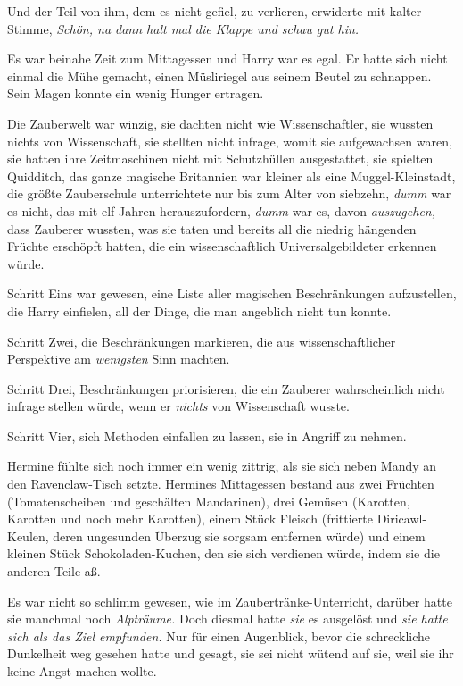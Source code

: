 {Und der Teil von ihm, dem es nicht gefiel, zu verlieren, erwiderte mit kalter Stimme, \emph{Schön, na dann halt mal die Klappe und schau gut hin.}

\later

Es war beinahe Zeit zum Mittagessen und Harry war es egal. Er hatte sich nicht einmal die Mühe gemacht, einen Müsliriegel aus seinem Beutel zu schnappen. Sein Magen konnte ein wenig Hunger ertragen.

Die Zauberwelt war winzig, sie dachten nicht wie Wissenschaftler, sie wussten nichts von Wissenschaft, sie stellten nicht infrage, womit sie aufgewachsen waren, sie hatten ihre Zeitmaschinen nicht mit Schutzhüllen ausgestattet, sie spielten Quidditch, das ganze magische Britannien war kleiner als eine Muggel-Kleinstadt, die größte Zauberschule unterrichtete nur bis zum Alter von siebzehn, \emph{dumm} war es nicht, das mit elf Jahren herauszufordern, \emph{dumm} war es, davon \emph{auszugehen,} dass Zauberer wussten, was sie taten und bereits all die niedrig hängenden Früchte erschöpft hatten, die ein wissenschaftlich Universalgebildeter erkennen würde.

Schritt Eins war gewesen, eine Liste aller magischen Beschränkungen aufzustellen, die Harry einfielen, all der Dinge, die man angeblich nicht tun konnte.

Schritt Zwei, die Beschränkungen markieren, die aus wissenschaftlicher Perspektive am \emph{wenigsten} Sinn machten.

Schritt Drei, Beschränkungen priorisieren, die ein Zauberer wahrscheinlich nicht infrage stellen würde, wenn er \emph{nichts} von Wissenschaft wusste.

Schritt Vier, sich Methoden einfallen zu lassen, sie in Angriff zu nehmen.

\later

Hermine fühlte sich noch immer ein wenig zittrig, als sie sich neben Mandy an den Ravenclaw-Tisch setzte. Hermines Mittagessen bestand aus zwei Früchten (Tomatenscheiben und geschälten Mandarinen), drei Gemüsen (Karotten, Karotten und noch mehr Karotten), einem Stück Fleisch (frittierte Diricawl-Keulen, deren ungesunden Überzug sie sorgsam entfernen würde) und einem kleinen Stück Schokoladen-Kuchen, den sie sich verdienen würde, indem sie die anderen Teile aß.

Es war nicht so schlimm gewesen, wie im Zaubertränke-Unterricht, darüber hatte sie manchmal noch \emph{Alpträume.} Doch diesmal hatte \emph{sie} es ausgelöst und \emph{sie hatte sich als das Ziel empfunden.} Nur für einen Augenblick, bevor die schreckliche Dunkelheit weg gesehen hatte und gesagt, sie sei nicht wütend auf sie, weil sie ihr keine Angst machen wollte.

}
